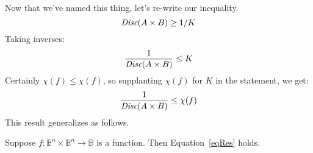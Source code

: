 \documentclass[12pt]{article}
\begin{document}
Now that we've named this thing, let's re-write our inequality.
\[\emph{Disc}(A \times B) \geq 1 / K\]
Taking inverses:
\[\frac{1}{\emph{Disc}(A \times B)} \leq K\]
Certainly $\chi(f) \leq \chi(f)$, so supplanting $\chi(f)$ for $K$ in the statement, we get:
\begin{equation}
\frac{1}{\emph{Disc}(A \times B)} \leq \chi(f)
\label{eqRes}
\end{equation}
This result generalizes as follows.
\begin{lemma}
Suppose $f : \mathbb{B}^n \times \mathbb{B}^n \to \mathbb{B}$ is a function.
Then Equation~\ref{eqRes} holds.
\end{lemma}
\end{document}
